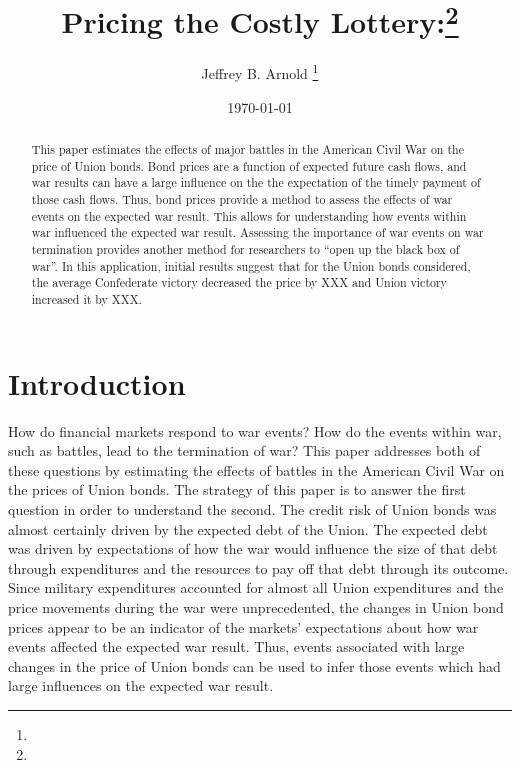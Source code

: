 \documentclass[11pt, oneside, article]{memoir}
\author{Jeffrey B. Arnold \thanks{\affiliations}}
\date{\today{}}
\title{Pricing the Costly Lottery:\thanks{\thanksnote}}
\begin{document}
\begin{titlingpage}
\maketitle{}

\begin{abstract}
\footnotesize
This paper estimates the effects of major battles in the American Civil War on the price of Union bonds.
Bond prices are a function of expected future cash flows, and war results can have a large influence on the the expectation of the timely payment of those cash flows.
Thus, bond prices provide a method to assess the effects of war events on the expected war result.
This allows for understanding how events within war influenced the expected war result.
Assessing the importance of war events on war termination provides another method for researchers to ``open up the black box of war''.
In this application, initial results suggest that for the Union bonds considered, the average Confederate victory decreased the price by XXX and Union victory increased it by XXX.
\end{abstract}

\end{titlingpage}

\section{Introduction}
\label{sec:introduction}

How do financial markets respond to war events?
How do the events within war, such as battles, lead to the termination of war?
This paper addresses both of these questions by estimating the effects of battles in the American Civil War on the prices of Union bonds.
The strategy of this paper is to answer the first question in order to understand the second.
The credit risk of Union bonds was almost certainly driven by the expected debt of the Union.
The expected debt was driven by expectations of how the war would influence the size of that debt through expenditures and the resources to pay off that debt through its outcome.
Since military expenditures accounted for almost all Union expenditures and the price movements during the war were unprecedented, the changes in Union bond prices appear to be an indicator of the markets' expectations about how war events affected the expected war result.
Thus, events associated with large changes in the price of Union bonds can be used to infer those events which had large influences on the expected war result.
\end{document}

